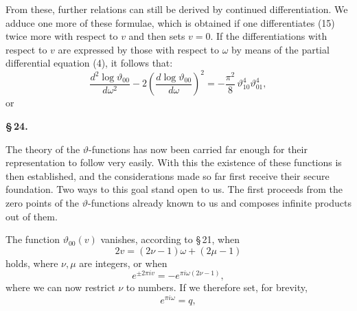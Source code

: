 
From these, further relations can still be derived by continued differentiation. We adduce one more of these formulae, which is obtained if one differentiates (15) twice more with respect to $v$ and then sets $v=0$. If the differentiations with respect to $v$ are expressed by those with respect to $\omega$ by means of the partial differential equation (4), it follows that:
\[
\frac{d^2\log\vartheta_{00}}{d\omega^2} - 2\left(\frac{d\log\vartheta_{00}}{d\omega}\right)^2 = -\frac{\pi^2}{8}\,\vartheta_{10}^4\vartheta_{01}^4,
\]
or

\begin{center}
\textbf{\S\,24. }\\
\textbf{}
\end{center}

The theory of the $\vartheta$-functions has now been carried far enough for their representation to follow very easily. With this the existence of these functions is then established, and the considerations made so far first receive their secure foundation. Two ways to this goal stand open to us. The first proceeds from the zero points of the $\vartheta$-functions already known to us and composes infinite products out of them.

The function $\vartheta_{00}(v)$ vanishes, according to \S\,21, when
\[
2v = (2\nu-1)\omega + (2\mu-1)
\]
holds, where $\nu, \mu$ are integers, or when
\[
e^{\pm 2\pi i v} = -e^{\pi i \omega(2\nu-1)},
\]
where we can now restrict $\nu$ to  numbers. If we therefore set, for brevity,
\[
e^{\pi i \omega} = q,
\]
